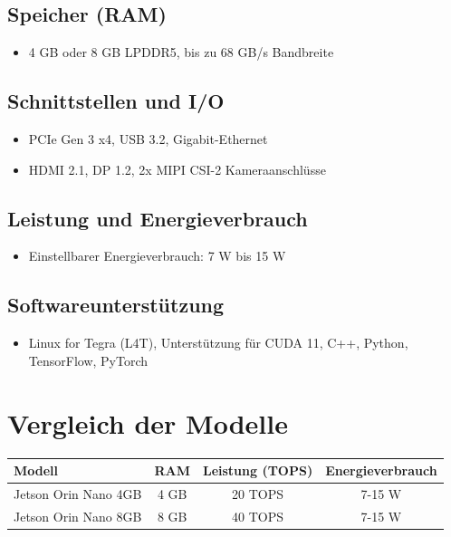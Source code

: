 \documentclass[12pt,a4paper]{report}
\begin{document}
\subsection{Speicher (RAM)}
\begin{itemize}
    \item 4 GB oder 8 GB LPDDR5, bis zu 68 GB/s Bandbreite
\end{itemize}

\subsection{Schnittstellen und I/O}
\begin{itemize}
    \item PCIe Gen 3 x4, USB 3.2, Gigabit-Ethernet
    \item HDMI 2.1, DP 1.2, 2x MIPI CSI-2 Kameraanschlüsse
\end{itemize}

\subsection{Leistung und Energieverbrauch}
\begin{itemize}
    \item Einstellbarer Energieverbrauch: 7 W bis 15 W
\end{itemize}

\subsection{Softwareunterstützung}
\begin{itemize}
    \item Linux for Tegra (L4T), Unterstützung für CUDA 11, C++, Python, TensorFlow, PyTorch
\end{itemize}

\section{Vergleich der Modelle}
\begin{tabular}{|l|c|c|c|}
\hline
\textbf{Modell} & \textbf{RAM} & \textbf{Leistung (TOPS)} & \textbf{Energieverbrauch} \\
\hline
Jetson Orin Nano 4GB & 4 GB & 20 TOPS & 7-15 W \\
Jetson Orin Nano 8GB & 8 GB & 40 TOPS & 7-15 W \\
\hline
\end{tabular}
\end{document}
